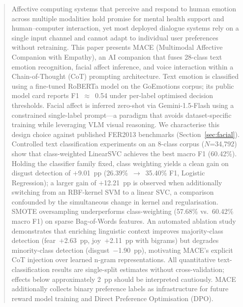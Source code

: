 \documentclass[sigconf, review=true]{acmart}
\begin{document}
\begin{abstract}
Affective computing systems that perceive and respond to human
emotion across multiple modalities hold promise for mental health
support and human--computer interaction, yet most deployed
dialogue systems rely on a single input channel and cannot adapt
to individual user preferences without retraining.
This paper presents MACE (Multimodal Affective Companion with
Empathy), an AI companion that fuses 28-class text emotion
recognition, facial affect inference, and voice interaction within
a Chain-of-Thought (CoT) prompting architecture.
Text emotion is classified using a fine-tuned RoBERTa model on
the GoEmotions corpus; its public model card reports
F1~$\approx$~0.54 under per-label optimised decision thresholds.
Facial affect is inferred zero-shot via Gemini-1.5-Flash using a
constrained single-label prompt---a paradigm that avoids
dataset-specific training while leveraging VLM visual reasoning.
We characterise this design choice against published FER2013
benchmarks (Section~\ref{sec:facial}).
Controlled text classification experiments on an 8-class corpus
($N$=34,792) show that class-weighted LinearSVC achieves the
best macro F1 (60.42\%).
Holding the classifier family fixed, class weighting yields a
clean gain on disgust detection of $+$9.01~pp (26.39\%~$\to$~35.40\%
F1, Logistic Regression); a larger gain of $+$12.21~pp is observed
when additionally switching from an RBF-kernel SVM to a linear
SVC, a comparison confounded by the simultaneous change in kernel
and regularisation.
SMOTE oversampling underperforms class-weighting (57.68\%
vs.\ 60.42\% macro F1) on sparse Bag-of-Words features.
An automated ablation study demonstrates that enriching
linguistic context improves majority-class detection
(fear~$+$2.63~pp, joy~$+$2.11~pp with bigrams) but degrades
minority-class detection (disgust~$-$1.90~pp), motivating MACE's
explicit CoT injection over learned n-gram representations.
All quantitative text-classification results are single-split
estimates without cross-validation; effects below approximately
2~pp should be interpreted cautiously.
MACE additionally collects binary preference labels as
infrastructure for future reward model training and
Direct Preference Optimisation (DPO).
\end{abstract}
\end{document}

